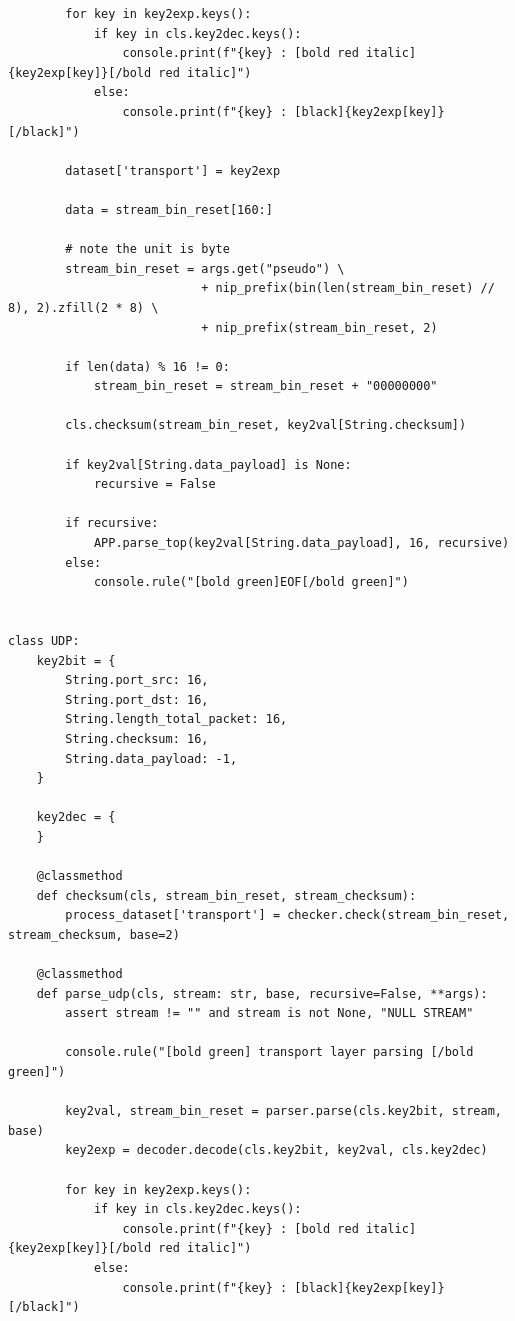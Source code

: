 \documentclass[a4paper,11pt]{article}
\begin{document}
\begin{spacing}{1.2}
\begin{CJK}{UTF8}{gbsn}
\begin{lstlisting}
        for key in key2exp.keys():
            if key in cls.key2dec.keys():
                console.print(f"{key} : [bold red italic]{key2exp[key]}[/bold red italic]")
            else:
                console.print(f"{key} : [black]{key2exp[key]}[/black]")

        dataset['transport'] = key2exp

        data = stream_bin_reset[160:]

        # note the unit is byte
        stream_bin_reset = args.get("pseudo") \
                           + nip_prefix(bin(len(stream_bin_reset) // 8), 2).zfill(2 * 8) \
                           + nip_prefix(stream_bin_reset, 2)

        if len(data) % 16 != 0:
            stream_bin_reset = stream_bin_reset + "00000000"

        cls.checksum(stream_bin_reset, key2val[String.checksum])

        if key2val[String.data_payload] is None:
            recursive = False

        if recursive:
            APP.parse_top(key2val[String.data_payload], 16, recursive)
        else:
            console.rule("[bold green]EOF[/bold green]")


class UDP:
    key2bit = {
        String.port_src: 16,
        String.port_dst: 16,
        String.length_total_packet: 16,
        String.checksum: 16,
        String.data_payload: -1,
    }

    key2dec = {
    }

    @classmethod
    def checksum(cls, stream_bin_reset, stream_checksum):
        process_dataset['transport'] = checker.check(stream_bin_reset, stream_checksum, base=2)

    @classmethod
    def parse_udp(cls, stream: str, base, recursive=False, **args):
        assert stream != "" and stream is not None, "NULL STREAM"

        console.rule("[bold green] transport layer parsing [/bold green]")

        key2val, stream_bin_reset = parser.parse(cls.key2bit, stream, base)
        key2exp = decoder.decode(cls.key2bit, key2val, cls.key2dec)

        for key in key2exp.keys():
            if key in cls.key2dec.keys():
                console.print(f"{key} : [bold red italic]{key2exp[key]}[/bold red italic]")
            else:
                console.print(f"{key} : [black]{key2exp[key]}[/black]")


\end{lstlisting}
\end{CJK}
\end{spacing}
\end{document}
